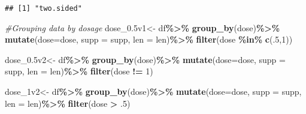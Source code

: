 \documentclass[
]{article}
\newenvironment{Shaded}{\begin{snugshade}}{\end{snugshade}}
\newcommand{\AttributeTok}[1]{\textcolor[rgb]{0.13,0.29,0.53}{#1}}
\newcommand{\CommentTok}[1]{\textcolor[rgb]{0.56,0.35,0.01}{\textit{#1}}}
\newcommand{\DecValTok}[1]{\textcolor[rgb]{0.00,0.00,0.81}{#1}}
\newcommand{\FloatTok}[1]{\textcolor[rgb]{0.00,0.00,0.81}{#1}}
\newcommand{\FunctionTok}[1]{\textcolor[rgb]{0.13,0.29,0.53}{\textbf{#1}}}
\newcommand{\NormalTok}[1]{#1}
\newcommand{\OtherTok}[1]{\textcolor[rgb]{0.56,0.35,0.01}{#1}}
\newcommand{\SpecialCharTok}[1]{\textcolor[rgb]{0.81,0.36,0.00}{\textbf{#1}}}
\begin{document}
\begin{verbatim}
## [1] "two.sided"
\end{verbatim}

\begin{Shaded}
\begin{Highlighting}[]
\CommentTok{\#Grouping data by dosage}
\NormalTok{dose\_0}\FloatTok{.5}\NormalTok{v1}\OtherTok{\textless{}{-}}
\NormalTok{df}\SpecialCharTok{\%\textgreater{}\%}
 \FunctionTok{group\_by}\NormalTok{(dose)}\SpecialCharTok{\%\textgreater{}\%}
 \FunctionTok{mutate}\NormalTok{(}\AttributeTok{dose=}\NormalTok{dose, }\AttributeTok{supp =}\NormalTok{ supp, }\AttributeTok{len =}\NormalTok{ len)}\SpecialCharTok{\%\textgreater{}\%}
 \FunctionTok{filter}\NormalTok{(dose }\SpecialCharTok{\%in\%} \FunctionTok{c}\NormalTok{(.}\DecValTok{5}\NormalTok{,}\DecValTok{1}\NormalTok{))}

\NormalTok{dose\_0}\FloatTok{.5}\NormalTok{v2}\OtherTok{\textless{}{-}}
\NormalTok{df}\SpecialCharTok{\%\textgreater{}\%}
 \FunctionTok{group\_by}\NormalTok{(dose)}\SpecialCharTok{\%\textgreater{}\%}
 \FunctionTok{mutate}\NormalTok{(}\AttributeTok{dose=}\NormalTok{dose, }\AttributeTok{supp =}\NormalTok{ supp, }\AttributeTok{len =}\NormalTok{ len)}\SpecialCharTok{\%\textgreater{}\%}
 \FunctionTok{filter}\NormalTok{(dose }\SpecialCharTok{!=} \DecValTok{1}\NormalTok{)}

\NormalTok{dose\_1v2}\OtherTok{\textless{}{-}}
\NormalTok{df}\SpecialCharTok{\%\textgreater{}\%}
 \FunctionTok{group\_by}\NormalTok{(dose)}\SpecialCharTok{\%\textgreater{}\%}
 \FunctionTok{mutate}\NormalTok{(}\AttributeTok{dose=}\NormalTok{dose, }\AttributeTok{supp =}\NormalTok{ supp, }\AttributeTok{len =}\NormalTok{ len)}\SpecialCharTok{\%\textgreater{}\%}
 \FunctionTok{filter}\NormalTok{(dose }\SpecialCharTok{\textgreater{}}\NormalTok{ .}\DecValTok{5}\NormalTok{)}
\end{Highlighting}
\end{Shaded}
\end{document}
